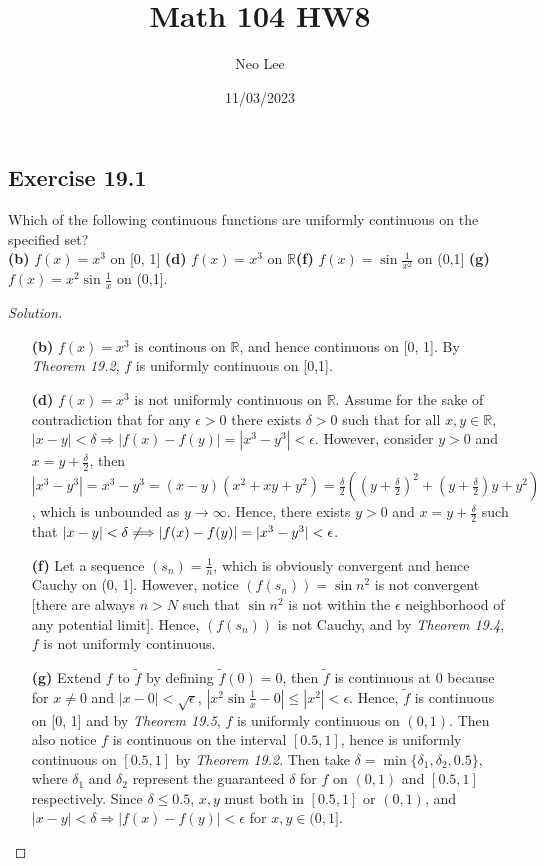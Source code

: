 \documentclass{article}
\title{Math 104 HW8}
\author{Neo Lee}
\date{11/03/2023}
\renewcommand*{\implies}{\ensuremath{\Longrightarrow}}
\newcommand*{\R}{\ensuremath{\mathbb{R}}}
\begin{document}
 

\maketitle 


\subsection*{Exercise 19.1}
Which of the following continuous functions are uniformly continuous on the specified set? \\
\textbf{(b)} $f(x)=x^3$ on [0, 1] \qquad \textbf{(d)} $f(x)=x^3$ on \R \qquad \textbf{(f)} $f(x)=\sin\frac{1}{x^2}$ on (0,1] 
\qquad \textbf{(g)} $f(x)=x^2\sin\frac{1}{x}$ on (0,1].
\begin{proof}[Solution]\indent
    \begin{enumerate}
        \item [\textbf{(b)}] $f(x)=x^3$ is continous on \R, and hence continuous on 
        [0, 1]. By \emph{Theorem 19.2}, $f$ is uniformly continuous on [0,1].

        \item [\textbf{(d)}] $f(x)=x^3$ is not uniformly continuous on \R. Assume for the sake of 
        contradiction that for any $\epsilon>0$ there exists $\delta>0$ such that for all $x,y\in\R$, $|x-y|<\delta \implies 
        |f(x)-f(y)|=|x^3-y^3|<\epsilon$. However, consider $y>0$ and 
        $x=y+\frac{\delta}{2}$, then $|x^3-y^3|=x^3-y^3=(x-y)(x^2+xy+y^2)=\frac{\delta}{2}\left((y+\frac{\delta}{2})^2
        +(y+\frac{\delta}{2})y+y^2\right)$, which is unbounded as $y\to\infty$. Hence, there exists 
        $y>0$ and $x=y+\frac{\delta}{2}$ such that $|x-y|<\delta \not\implies 
        |f(x)-f(y)|=|x^3-y^3|<\epsilon$.

        \item [\textbf{(f)}] Let a sequence $(s_n)=\frac{1}{n}$, which is obviously convergent and 
        hence Cauchy on (0, 1]. However, notice $(f(s_n))=\sin n^2$ is not convergent [there are 
        always $n>N$ such that $\sin n^2$ is not within the $\epsilon$ neighborhood of any potential 
        limit]. Hence, $(f(s_n))$ is not Cauchy, and by \emph{Theorem 19.4}, $f$ is not 
        uniformly continuous.

        \item [\textbf{(g)}] Extend $f$ to $\tilde{f}$ by defining $\tilde{f}(0)=0$, 
        then $\tilde{f}$ is continuous at 0 because for $x\neq0$ and $|x-0|<\sqrt{\epsilon}$, 
        $|x^2\sin\frac{1}{x}-0|\le |x^2| < \epsilon$. Hence, $\tilde{f}$ is continuous on 
        [0, 1] and by \emph{Theorem  19.5}, $f$ is uniformly continuous on $(0,1)$. Then 
        also notice $f$ is continuous on the interval $[0.5,1]$, hence is uniformly continuous on 
        $[0.5,1]$ by \emph{Theorem 19.2}. Then take $\delta=\min\{\delta_1, \delta_2, 0.5\}$, 
        where $\delta_1$ and $\delta_2$ represent the guaranteed $\delta$ for $f$ on $(0,1)$ and 
        $[0.5,1]$ respectively. Since $\delta\le 0.5$, $x,y$ must both in $[0.5,1]$ or $(0,1)$, and 
        $|x-y|<\delta \implies |f(x)-f(y)|<\epsilon$ for $x,y\in(0,1]$.
    \end{enumerate}
    

\end{proof}
\end{document}
